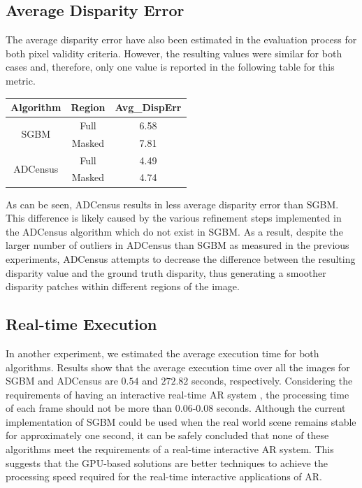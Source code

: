 \subsection{Average Disparity Error}
The average disparity error have also been estimated in the evaluation process for both pixel validity criteria. However, the resulting values
were similar for both cases and, therefore, only one value is reported in the following table for this metric.

\begin{minipage}{0.8\linewidth}
\begin{center}
\label{tab:avgerr}
\begin{tabular}{ |c|c|c| }
\hline
Algorithm & Region & Avg\_DispErr \\ \hline
\multirow{2}{*}{SGBM} & Full & 6.58 \\ \cline{2-3}
& Masked & 7.81 \\ \hline
\multirow{2}{*}{ADCensus} & Full & 4.49 \\ \cline{2-3}
& Masked & 4.74 \\ \hline
\end{tabular}
\end{center}
\end{minipage} \newline

As can be seen, ADCensus results in less average disparity error than SGBM. This difference is likely caused by the various refinement steps
implemented in the ADCensus algorithm which do not exist in SGBM.
As a result, despite the larger number of outliers in ADCensus than SGBM as measured in the previous experiments,
ADCensus attempts to decrease the difference between the resulting disparity value and the ground truth disparity, thus generating a smoother disparity patches
within different regions of the image.

\subsection{Real-time Execution}
In another experiment, we estimated the average execution time for both algorithms. Results show that the average execution time over all the images 
for SGBM and ADCensus are $0.54$ and $272.82$ seconds, respectively.
Considering the requirements of having an interactive real-time AR system \cite{hertz00}, the processing time of each frame should not be more than 0.06-0.08 seconds.
Although the current implementation of SGBM could be used when the real world scene remains stable for approximately one second, it can be safely concluded that
none of these algorithms meet the requirements of a real-time interactive AR system.
This suggests that the GPU-based solutions are better techniques to achieve the processing speed required for the real-time 
interactive applications of AR.

